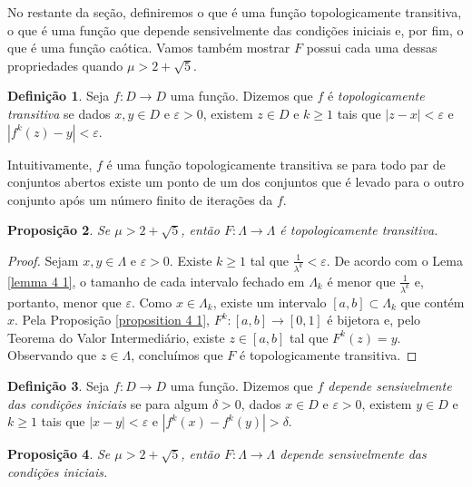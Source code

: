 \documentclass[a4paper, 12pt]{article}
\theoremstyle{definition}
\newtheorem{definition}{Definição}[section]
\theoremstyle{plain}
\newtheorem{proposition}[definition]{Proposição}
\theoremstyle{plain}
\theoremstyle{plain}
\theoremstyle{remark}
\begin{document}
No restante da seção, definiremos o que é uma função topologicamente transitiva, o que é uma função que depende sensivelmente das condições iniciais e, por fim, o que é uma função caótica. Vamos também mostrar $F$ possui cada uma dessas propriedades quando $\mu > 2 + \sqrt{5}$.

\begin{definition}
Seja $f: D \rightarrow D$ uma função. Dizemos que $f$ é \textit{topologicamente transitiva} se dados $x, y \in D$ e $\varepsilon > 0$,  existem $z \in D$ e $k \geq 1$ tais que $|z - x| < \varepsilon$ e $|f^k(z) - y| < \varepsilon$.
\end{definition} 

Intuitivamente, $f$ é uma função topologicamente transitiva se para todo par de conjuntos abertos existe um ponto de um dos conjuntos que é levado para o outro conjunto após um número finito de iterações da $f$.

\begin{proposition}
\label{proposition 4 3}
Se $\mu > 2 + \sqrt{5}$, então $F: \Lambda \rightarrow \Lambda$ é topologicamente transitiva.
\end{proposition}

\begin{proof}
Sejam $x, y \in \Lambda$ e $\varepsilon > 0$. Existe $k \geq 1$ tal que $\frac{1}{\lambda^k} < \varepsilon$. De acordo com o Lema \ref{lemma 4 1}, o tamanho de cada intervalo fechado em $\Lambda_k$ é menor que $\frac{1}{\lambda^k}$ e, portanto, menor que $\varepsilon$. Como $x \in \Lambda_ k$, existe um intervalo $[a, b] \subset \Lambda_ k$ que contém $x$. Pela Proposição \ref{proposition 4 1}, $F^k: [a, b] \rightarrow [0, 1]$ é bijetora e, pelo Teorema do Valor Intermediário, existe $z \in [a, b]$ tal que $F^k(z) = y$. Observando que $z \in \Lambda$, concluímos que $F$ é topologicamente transitiva.
\end{proof}

\begin{definition}
Seja $f: D \rightarrow D$ uma função. Dizemos que \textit{$f$ depende sensivelmente das condições iniciais} se para algum $\delta > 0$, dados $x \in D$ e $\varepsilon > 0$, existem $y \in D$ e $k \geq 1$ tais que $|x - y| < \varepsilon$ e $|f^k(x) - f^k(y)| > \delta$.
\end{definition}

\begin{proposition}
\label{proposition 4 4}
Se $\mu > 2 + \sqrt{5}$, então $F: \Lambda \rightarrow \Lambda$ depende sensivelmente das condições iniciais.
\end{proposition}
\end{document}
